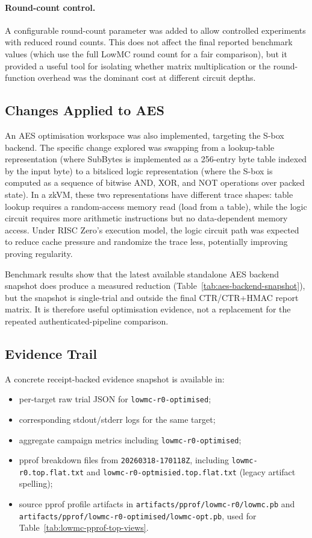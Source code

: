 \paragraph{Round-count control.}
A configurable round-count parameter was added to allow controlled experiments
with reduced round counts. This does not affect the final reported benchmark
values (which use the full LowMC round count for a fair comparison), but it
provided a useful tool for isolating whether matrix multiplication or the
round-function overhead was the dominant cost at different circuit depths.

\subsection*{Changes Applied to AES}

An AES optimisation workspace was also implemented, targeting the S-box backend.
The specific change explored was swapping from a lookup-table representation
(where SubBytes is implemented as a 256-entry byte table indexed by the input
byte) to a bitsliced logic representation (where the S-box is computed as a
sequence of bitwise AND, XOR, and NOT operations over packed state). In a zkVM,
these two representations have different trace shapes: table lookup requires a
random-access memory read (load from a table), while the logic circuit requires
more arithmetic instructions but no data-dependent memory access. Under RISC
Zero's execution model, the logic circuit path was expected to reduce cache
pressure and randomize the trace less, potentially improving proving regularity.

Benchmark results show that the latest available standalone AES backend snapshot
does produce a measured reduction (Table~\ref{tab:aes-backend-snapshot}), but the
snapshot is single-trial and outside the final CTR/CTR+HMAC report matrix. It is
therefore useful optimisation evidence, not a replacement for the repeated
authenticated-pipeline comparison.

\subsection*{Evidence Trail}


A concrete receipt-backed evidence snapshot is available in:

\begin{itemize}
\item per-target raw trial JSON for \texttt{lowmc-r0-optimised};
\item corresponding stdout/stderr logs for the same target;
\item aggregate campaign metrics including \texttt{lowmc-r0-optimised};
\item pprof breakdown files from \texttt{20260318-170118Z}, including
\texttt{lowmc-r0.top.flat.txt} and
\texttt{lowmc-r0-optmisied.top.flat.txt} (legacy artifact spelling);
\item source pprof profile artifacts in \texttt{artifacts/pprof/lowmc-r0/lowmc.pb}
and \texttt{artifacts/pprof/lowmc-r0-optimised/lowmc-opt.pb}, used for
Table~\ref{tab:lowmc-pprof-top-views}.
\end{itemize}

